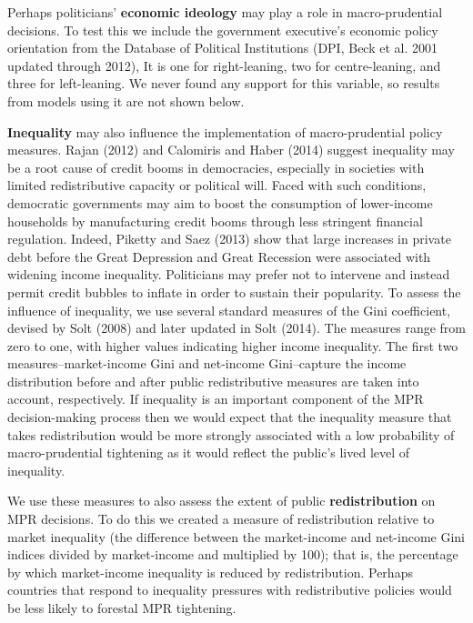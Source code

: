 \documentclass[]{article}
\begin{document}
Perhaps politicians' \textbf{economic ideology} may play a role in
macro-prudential decisions. To test this we include the government
executive's economic policy orientation from the Database of Political
Institutions (DPI, Beck et al. 2001 updated through 2012), It is one for
right-leaning, two for centre-leaning, and three for left-leaning. We
never found any support for this variable, so results from models using
it are not shown below.

\textbf{Inequality} may also influence the implementation of
macro-prudential policy measures. Rajan (2012) and Calomiris and Haber
(2014) suggest inequality may be a root cause of credit booms in
democracies, especially in societies with limited redistributive
capacity or political will. Faced with such conditions, democratic
governments may aim to boost the consumption of lower-income households
by manufacturing credit booms through less stringent financial
regulation. Indeed, Piketty and Saez (2013) show that large increases in
private debt before the Great Depression and Great Recession were
associated with widening income inequality. Politicians may prefer not
to intervene and instead permit credit bubbles to inflate in order to
sustain their popularity. To assess the influence of inequality, we use
several standard measures of the Gini coefficient, devised by Solt
(2008) and later updated in Solt (2014). The measures range from zero to
one, with higher values indicating higher income inequality. The first
two measures--market-income Gini and net-income Gini--capture the income
distribution before and after public redistributive measures are taken
into account, respectively. If inequality is an important component of
the MPR decision-making process then we would expect that the inequality
measure that takes redistribution would be more strongly associated with
a low probability of macro-prudential tightening as it would reflect the
public's lived level of inequality.

We use these measures to also assess the extent of public
\textbf{redistribution} on MPR decisions. To do this we created a
measure of redistribution relative to market inequality (the difference
between the market-income and net-income Gini indices divided by
market-income and multiplied by 100); that is, the percentage by which
market-income inequality is reduced by redistribution. Perhaps countries
that respond to inequality pressures with redistributive policies would
be less likely to forestal MPR tightening.
\end{document}
